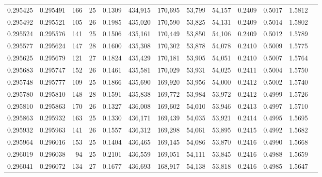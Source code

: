 \begin{tabular}{rrrrrrrrrrrrr}
0.295425 & 0.295491 &   166 &  25 &                                     0.1309 & 434,915 & 170,695 &  53,799 &  54,157 & 0.2409 & 0.5017 & 1.5812 \\
0.295492 & 0.295521 &   105 &  26 &                                     0.1985 & 435,020 & 170,590 &  53,825 &  54,131 & 0.2409 & 0.5014 & 1.5802 \\
0.295524 & 0.295576 &   141 &  25 &                                     0.1506 & 435,161 & 170,449 &  53,850 &  54,106 & 0.2409 & 0.5012 & 1.5789 \\
0.295577 & 0.295624 &   147 &  28 &                                     0.1600 & 435,308 & 170,302 &  53,878 &  54,078 & 0.2410 & 0.5009 & 1.5775 \\
0.295625 & 0.295679 &   121 &  27 &                                     0.1824 & 435,429 & 170,181 &  53,905 &  54,051 & 0.2410 & 0.5007 & 1.5764 \\
0.295683 & 0.295747 &   152 &  26 &                                     0.1461 & 435,581 & 170,029 &  53,931 &  54,025 & 0.2411 & 0.5004 & 1.5750 \\
0.295748 & 0.295777 &   109 &  25 &                                     0.1866 & 435,690 & 169,920 &  53,956 &  54,000 & 0.2412 & 0.5002 & 1.5740 \\
0.295780 & 0.295810 &   148 &  28 &                                     0.1591 & 435,838 & 169,772 &  53,984 &  53,972 & 0.2412 & 0.4999 & 1.5726 \\
0.295810 & 0.295863 &   170 &  26 &                                     0.1327 & 436,008 & 169,602 &  54,010 &  53,946 & 0.2413 & 0.4997 & 1.5710 \\
0.295863 & 0.295932 &   163 &  25 &                                     0.1330 & 436,171 & 169,439 &  54,035 &  53,921 & 0.2414 & 0.4995 & 1.5695 \\
0.295932 & 0.295963 &   141 &  26 &                                     0.1557 & 436,312 & 169,298 &  54,061 &  53,895 & 0.2415 & 0.4992 & 1.5682 \\
0.295964 & 0.296016 &   153 &  25 &                                     0.1404 & 436,465 & 169,145 &  54,086 &  53,870 & 0.2416 & 0.4990 & 1.5668 \\
0.296019 & 0.296038 &    94 &  25 &                                     0.2101 & 436,559 & 169,051 &  54,111 &  53,845 & 0.2416 & 0.4988 & 1.5659 \\
0.296041 & 0.296072 &   134 &  27 &                                     0.1677 & 436,693 & 168,917 &  54,138 &  53,818 & 0.2416 & 0.4985 & 1.5647 \\

\end{tabular}
